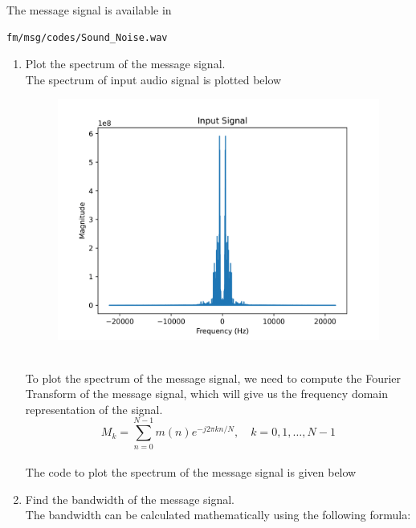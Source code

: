 The message signal is available in 
\begin{lstlisting}
fm/msg/codes/Sound_Noise.wav
\end{lstlisting}
\begin{enumerate}[label=\arabic*.,ref=\thesection.\theenumi]
\item Plot the spectrum of the message signal.\\
\solution The spectrum of input audio signal is plotted below\\
\begin{figure}[h]
    \includegraphics[scale=0.55]{fm/msg/inputs-1.png}
\end{figure}
\\
To plot the spectrum of the message signal, we need to compute the Fourier Transform of the message signal, which will give us the frequency domain representation of the signal.
\begin{equation}
M_k = \sum_{n=0}^{N-1} m(n) e^{-j2\pi kn/N}, \quad k=0,1,\dots,N-1
\end{equation}
\\
The code to plot the spectrum of the message signal is given below
\begin{center}
\end{center}
\item Find the bandwidth of the message signal.\\
\solution The bandwidth can be calculated mathematically using the following formula:

\end{enumerate}
